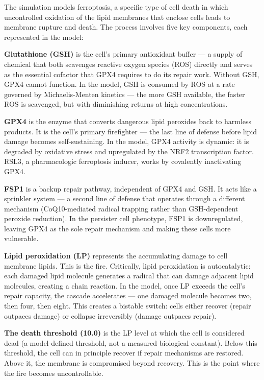 \documentclass[11pt,twoside,openright]{report}
\begin{document}
The simulation models ferroptosis, a specific type of cell death in which uncontrolled oxidation of the lipid membranes that enclose cells leads to membrane rupture and death. The process involves five key components, each represented in the model:

\textbf{Glutathione (GSH)} is the cell's primary antioxidant buffer --- a supply of chemical that both scavenges reactive oxygen species (ROS) directly and serves as the essential cofactor that GPX4 requires to do its repair work. Without GSH, GPX4 cannot function. In the model, GSH is consumed by ROS at a rate governed by Michaelis-Menten kinetics --- the more GSH available, the faster ROS is scavenged, but with diminishing returns at high concentrations.

\textbf{GPX4} is the enzyme that converts dangerous lipid peroxides back to harmless products. It is the cell's primary firefighter --- the last line of defense before lipid damage becomes self-sustaining. In the model, GPX4 activity is dynamic: it is degraded by oxidative stress and upregulated by the NRF2 transcription factor. RSL3, a pharmacologic ferroptosis inducer, works by covalently inactivating GPX4.

\textbf{FSP1} is a backup repair pathway, independent of GPX4 and GSH. It acts like a sprinkler system --- a second line of defense that operates through a different mechanism (CoQ10-mediated radical trapping rather than GSH-dependent peroxide reduction). In the persister cell phenotype, FSP1 is downregulated, leaving GPX4 as the sole repair mechanism and making these cells more vulnerable.

\textbf{Lipid peroxidation (LP)} represents the accumulating damage to cell membrane lipids. This is the fire. Critically, lipid peroxidation is autocatalytic: each damaged lipid molecule generates a radical that can damage adjacent lipid molecules, creating a chain reaction. In the model, once LP exceeds the cell's repair capacity, the cascade accelerates --- one damaged molecule becomes two, then four, then eight. This creates a bistable switch: cells either recover (repair outpaces damage) or collapse irreversibly (damage outpaces repair).

\textbf{The death threshold (10.0)} is the LP level at which the cell is considered dead (a model-defined threshold, not a measured biological constant). Below this threshold, the cell can in principle recover if repair mechanisms are restored. Above it, the membrane is compromised beyond recovery. This is the point where the fire becomes uncontrollable.
\end{document}
